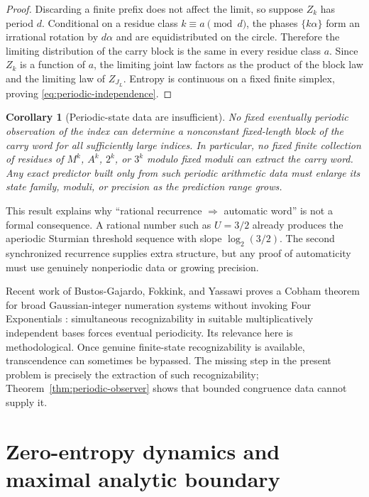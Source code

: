 \documentclass[11pt,oneside]{article}
\newtheorem{corollary}[theorem]{Corollary}
\theoremstyle{definition}
\theoremstyle{remark}
\begin{document}
\begin{proof}
Discarding a finite prefix does not affect the limit, so suppose $Z_k$ has period $d$.  Conditional on a residue class $k\equiv a\pmod d$, the phases $\{k\alpha\}$ form an irrational rotation by $d\alpha$ and are equidistributed on the circle.  Therefore the limiting distribution of the carry block is the same in every residue class $a$.  Since $Z_k$ is a function of $a$, the limiting joint law factors as the product of the block law and the limiting law of $Z_{J_L}$.  Entropy is continuous on a fixed finite simplex, proving \eqref{eq:periodic-independence}.
\end{proof}

\begin{corollary}[Periodic-state data are insufficient]\label{cor:state-growth}
No fixed eventually periodic observation of the index can determine a nonconstant fixed-length block of the carry word for all sufficiently large indices.  In particular, no fixed finite collection of residues of $M^k$, $A^k$, $2^k$, or $3^k$ modulo fixed moduli can extract the carry word.  Any exact predictor built only from such periodic arithmetic data must enlarge its state family, moduli, or precision as the prediction range grows.
\end{corollary}

This result explains why ``rational recurrence $\Rightarrow$ automatic word'' is not a formal consequence.  A rational number such as $U=3/2$ already produces the aperiodic Sturmian threshold sequence with slope $\log_2(3/2)$.  The second synchronized recurrence supplies extra structure, but any proof of automaticity must use genuinely nonperiodic data or growing precision.

Recent work of Bustos-Gajardo, Fokkink, and Yassawi proves a Cobham theorem for broad Gaussian-integer numeration systems without invoking Four Exponentials \cite{BustosFokkinkYassawi2026}: simultaneous recognizability in suitable multiplicatively independent bases forces eventual periodicity.  Its relevance here is methodological.  Once genuine finite-state recognizability is available, transcendence can sometimes be bypassed.  The missing step in the present problem is precisely the extraction of such recognizability; Theorem~\ref{thm:periodic-observer} shows that bounded congruence data cannot supply it.

\section{Zero-entropy dynamics and maximal analytic boundary}\label{sec:dynamics-complex}
\end{document}
